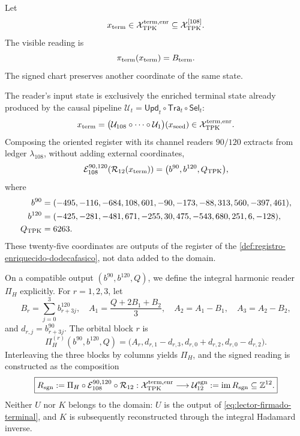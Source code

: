 Let
\[
 x_{\rm term}\in
 \mathcal X_{\rm TPK}^{\rm term,enr}
 \subseteq\mathcal X_{\rm TPK}^{[108]}.
\]
The visible reading is
\[
 \pi_{\rm term}(x_{\rm term})=B_{\rm term}.
\]
The signed chart preserves another coordinate of the same state.

\begin{definition}
\label{def:subespacio-firmado-terminal}
The reader's input state is exclusively the enriched terminal state already produced by the causal pipeline \(\mathcal U_t=\mathsf{Upd}_t\circ\mathsf{Tra}_t\circ\mathsf{Sel}_t\):
\begin{equation}
 x_{\rm term}
 =\bigl(\mathcal U_{108}\circ\cdots\circ\mathcal U_1\bigr)
   (x_{\rm seed})
 \in\mathcal X_{\rm TPK}^{\rm term,enr}.
 \label{eq:subespacio-firmado-terminal}
\end{equation}
Composing the oriented register with its channel readers \(90/120\) extracts from ledger \(\lambda_{108}\), without adding external coordinates,
\begin{equation}
 \mathcal E_{108}^{90,120}\!\left(\mathcal R_{12}(x_{\rm term})\right)
 =\bigl(b^{90},b^{120},Q_{\rm TPK}\bigr),
 \label{eq:canales-ledger-previos-u}
\end{equation}
where
\begin{align}
 b^{90}={}&(-495,-116,-684,108,601,-90,
             -173,-88,313,560,-397,461),\notag\\
 b^{120}={}&(-425,-281,-481,671,-255,30,
              475,-543,680,251,6,-128),\notag\\
 Q_{\rm TPK}={}&6263.\notag
\end{align}
These twenty-five coordinates are outputs of the register of the \cref{def:registro-enriquecido-dodecafasico}, not data added to the domain.

On a compatible output \((b^{90},b^{120},Q)\), we define the integral harmonic reader \(\Pi_H\) explicitly. For \(r=1,2,3\), let
\begin{equation}
 B_r=\sum_{j=0}^{3}b^{120}_{r+3j},
 \quad
 A_1=\frac{Q+2B_1+B_2}{3},
 \quad A_2=A_1-B_1,
 \quad A_3=A_2-B_2,
 \label{eq:lector-armonico-a-desde-ledger}
\end{equation}
and \(d_{r,j}=b^{90}_{r+3j}\). The orbital block \(r\) is
\begin{equation}
 \Pi_H^{(r)}(b^{90},b^{120},Q)
 =\bigl(A_r,d_{r,1}-d_{r,3},
              d_{r,0}+d_{r,2},d_{r,0}-d_{r,2}\bigr).
 \label{eq:lector-armonico-bloque-desde-ledger}
\end{equation}
Interleaving the three blocks by columns yields \(\Pi_H\), and the signed reading is constructed as the composition
\begin{equation}
 \boxed{
 R_{\rm sgn}:=
 \Pi_H\circ\mathcal E_{108}^{90,120}\circ\mathcal R_{12}:
 \mathcal X_{\rm TPK}^{\rm term,enr}
 \longrightarrow\mathcal U_{12}^{\rm sgn}:=
 \operatorname{im}R_{\rm sgn}\subseteq\mathbb Z^{12}.}
 \label{eq:lector-firmado-terminal}
\end{equation}
Neither \(U\) nor \(K\) belongs to the domain: \(U\) is the output of \eqref{eq:lector-firmado-terminal}, and \(K\) is subsequently reconstructed through the integral Hadamard inverse.
\end{definition}


